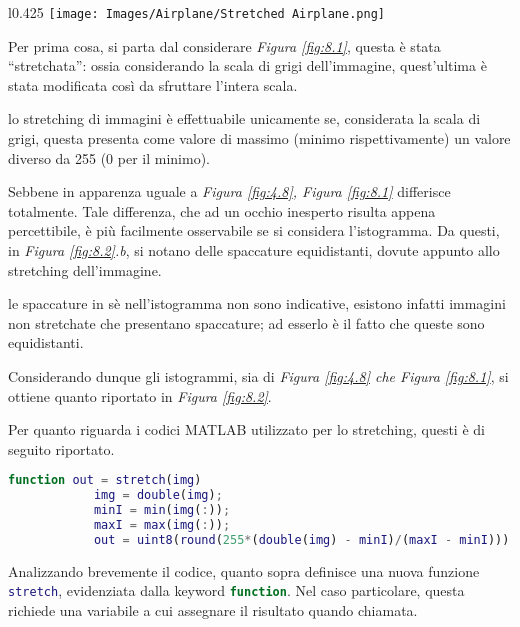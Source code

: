 \documentclass{subfiles}
\begin{document}
\begin{wrapfigure}[16]{l}{0.425\textwidth}
    \centering
    \texttt{[image: Images/Airplane/Stretched Airplane.png]}
    \caption{Stretching di \emph{Figura \ref{fig:4.8}}.}
    \label{fig:8.1}
\end{wrapfigure}
Per prima cosa, si parta dal considerare \emph{Figura \ref{fig:8.1}}, questa è stata ``stretchata'': ossia considerando la scala di grigi dell'immagine,
quest'ultima è stata modificata così da sfruttare l'intera scala.

\begin{Remark*}
    lo stretching di immagini è effettuabile unicamente se, considerata la scala di grigi,
    questa presenta come valore di massimo (minimo rispettivamente) un valore diverso da 255 (0 per il minimo).
\end{Remark*}

\noindent Sebbene in apparenza uguale a \emph{Figura \ref{fig:4.8}, Figura \ref{fig:8.1}} differisce totalmente.
Tale differenza, che ad un occhio inesperto risulta appena percettibile, è più facilmente osservabile se si considera l'istogramma.
Da questi, in \emph{Figura \ref{fig:8.2}.b}, si notano delle spaccature equidistanti, dovute appunto allo stretching dell'immagine.

\begin{Remark*}
    le spaccature in sè nell'istogramma non sono indicative, esistono infatti immagini non stretchate che presentano spaccature;
    ad esserlo è il fatto che queste sono equidistanti.
\end{Remark*}

\noindent Considerando dunque gli istogrammi, sia di \emph{Figura \ref{fig:4.8} \emph{che} Figura \ref{fig:8.1}}, si ottiene quanto riportato in \emph{Figura \ref{fig:8.2}}.


Per quanto riguarda i codici MATLAB utilizzato per lo stretching, questi è di seguito riportato.
\begin{center}
    \begin{lstlisting}[language = MATLAB]
        function out = stretch(img)
            img = double(img);
            minI = min(img(:));
            maxI = max(img(:));
            out = uint8(round(255*(double(img) - minI)/(maxI - minI)));
    \end{lstlisting}
\end{center}

Analizzando brevemente il codice, quanto sopra definisce una nuova funzione \lstinline[language = MATLAB]{stretch},
evidenziata dalla keyword \lstinline[language = MATLAB]{function}. Nel caso particolare, questa richiede una variabile a cui assegnare il risultato quando chiamata.
\end{document}
